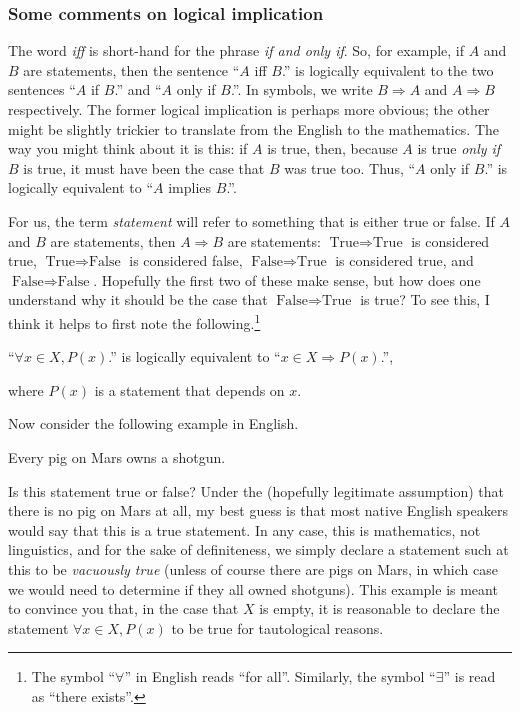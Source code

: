 \subsubsection{Some comments on logical implication}

The word \emph{iff} is short-hand for the phrase \emph{if and only if}.  So, for example, if $A$ and $B$ are statements, then the sentence ``$A$ iff $B$.'' is logically equivalent to the two sentences ``$A$ if $B$.'' and ``$A$ only if $B$.''.  In symbols, we write $B\Rightarrow A$ and $A\Rightarrow B$ respectively.  The former logical implication is perhaps more obvious; the other might be slightly trickier to translate from the English to the mathematics.  The way you might think about it is this:  if $A$ is true, then, because $A$ is true \emph{only if} $B$ is true, it must have been the case that $B$ was true too.  Thus, ``$A$ only if $B$.'' is logically equivalent to ``$A$ implies $B$.''.

For us, the term \emph{statement} will refer to something that is either true or false.  If $A$ and $B$ are statements, then $A\Rightarrow B$ are statements:  $\text{True}\Rightarrow \text{True}$ is considered true, $\text{True}\Rightarrow \text{False}$ is considered false, $\text{False}\Rightarrow \text{True}$ is considered true, and $\text{False}\Rightarrow \text{False}$.  Hopefully the first two of these make sense, but how does one understand why it should be the case that $\text{False}\Rightarrow \text{True}$ is true?  To see this, I think it helps to first note the following.\footnote{The symbol ``$\forall$\index[notation]{$\forall$}'' in English reads ``for all''.  Similarly, the symbol ``$\exists$\index[notation]{$\exists$}'' is read as ``there exists''.}
\begin{textequation}[A.1.3]
``$\forall x\in X,P(x)$.'' is logically equivalent to ``$x\in X\Rightarrow P(x)$.'',
\end{textequation}
where $P(x)$ is a statement that depends on $x$.

Now consider the following example in English.
\begin{textequation}
Every pig on Mars owns a shotgun.
\end{textequation}
Is this statement true or false?  Under the (hopefully legitimate assumption) that there is no pig on Mars at all, my best guess is that most native English speakers would say that this is a true statement.  In any case, this is mathematics, not linguistics, and for the sake of definiteness, we simply declare a statement such at this to be \emph{vacuously true} (unless of course there are pigs on Mars, in which case we would need to determine if they all owned shotguns).  This example is meant to convince you that, in the case that $X$ is empty, it is reasonable to declare the statement $\forall x\in X,P(x)$ to be true for tautological reasons.

